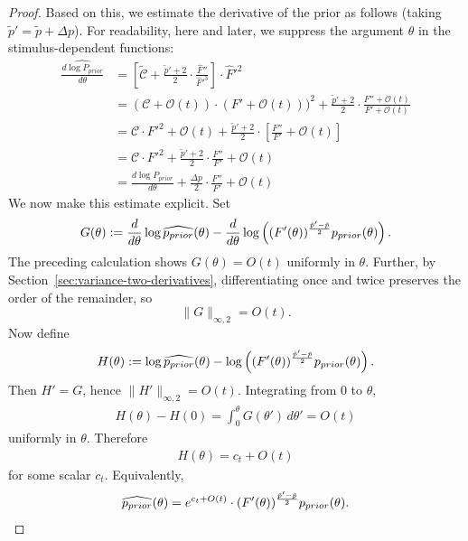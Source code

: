 \begin{proof}
    
Based on this, we estimate the derivative of the prior as follows (taking $\tilde{p}' = \tilde{p} + \Delta p$). For readability, here and later, we suppress the argument $\theta$ in the stimulus-dependent functions:
\begin{align*}
        \widehat{\frac{d \log P_{prior}}{d \theta}} &= [\tilde{\mathcal{C}} + \frac{\tilde{p}'+2}{2} \cdot \frac{\widehat{F}''}{\widehat{F}'^3}] \cdot \widehat{F}'^2\\
    &= (\mathcal{C}+\mathcal{O}(t)) \cdot (F' + \mathcal{O}(t)))^2 + \frac{\tilde{p}'+2}{2} \cdot \frac{F'' + \mathcal{O}(t)}{F' + \mathcal{O}(t)} \\
    &= \mathcal{C} \cdot F'^2 + \mathcal{O}(t) + \frac{\tilde{p}'+2}{2} \cdot [\frac{F''}{F'} + \mathcal{O}(t)]\\
    &= \mathcal{C} \cdot F'^2 + \frac{\tilde{p}'+2}{2} \cdot \frac{F''}{F'} + \mathcal{O}(t) \\
    &= \frac{d \log P_{prior}}{d \theta} + \frac{\Delta p}{2} \cdot \frac{F''}{F'} + \mathcal{O}(t)
\end{align*}
%
We now make this estimate explicit. Set
\begin{align*}
    G(\theta) := \frac{d}{d\theta}\log\widehat{p_{prior}}(\theta) - \frac{d}{d\theta}\log\left((F'(\theta))^{\frac{\tilde{p}'-\tilde{p}}{2}}p_{prior}(\theta)\right).
\end{align*}
The preceding calculation shows \(G(\theta)=O(t)\) uniformly in \(\theta\). Further, by Section~\ref{sec:variance-two-derivatives}, differentiating once and twice preserves the order of the remainder, so
\begin{equation}
    \|G\|_{\infty,2} = O(t).
\end{equation}
Now define
\begin{align*}
    H(\theta) := \log\widehat{p_{prior}}(\theta) - \log\left((F'(\theta))^{\frac{\tilde{p}'-\tilde{p}}{2}}p_{prior}(\theta)\right).
\end{align*}
Then \(H' = G\), hence \(\|H'\|_{\infty,2}=O(t)\). Integrating from \(0\) to \(\theta\),
\begin{align*}
    H(\theta)-H(0) = \int_0^\theta G(\theta')\,d\theta' = O(t)
\end{align*}
uniformly in \(\theta\). Therefore
\begin{align*}
    H(\theta) = c_t + O(t)
\end{align*}
for some scalar \(c_t\). Equivalently,
\begin{align*}
    \widehat{\Prior}(\theta) = e^{c_t+O(t)}\cdot (F'(\theta))^{\frac{\tilde{p}'-\tilde{p}}{2}}\Prior(\theta).

\end{align*}
\end{proof}
